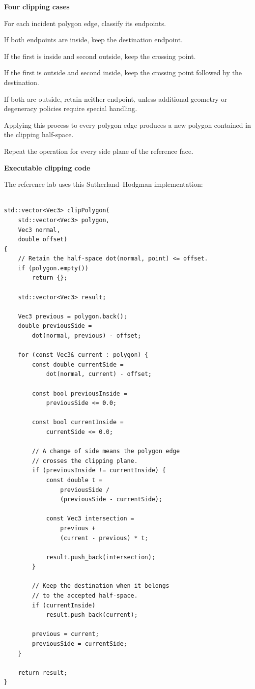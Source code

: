 \textbf{Four clipping cases}

For each incident polygon edge, classify its endpoints.

If both endpoints are inside, keep the destination endpoint.

If the first is inside and second outside, keep the crossing point.

If the first is outside and second inside, keep the crossing point followed by the destination.

If both are outside, retain neither endpoint, unless additional geometry or degeneracy policies require special handling.

Applying this process to every polygon edge produces a new polygon contained in the clipping half-space.

Repeat the operation for every side plane of the reference face.

\textbf{Executable clipping code}

The reference lab uses this Sutherland--Hodgman implementation:

\begin{verbatim}

std::vector<Vec3> clipPolygon(
    std::vector<Vec3> polygon,
    Vec3 normal,
    double offset)
{
    // Retain the half-space dot(normal, point) <= offset.
    if (polygon.empty())
        return {};

    std::vector<Vec3> result;

    Vec3 previous = polygon.back();
    double previousSide =
        dot(normal, previous) - offset;

    for (const Vec3& current : polygon) {
        const double currentSide =
            dot(normal, current) - offset;

        const bool previousInside =
            previousSide <= 0.0;

        const bool currentInside =
            currentSide <= 0.0;

        // A change of side means the polygon edge
        // crosses the clipping plane.
        if (previousInside != currentInside) {
            const double t =
                previousSide /
                (previousSide - currentSide);

            const Vec3 intersection =
                previous +
                (current - previous) * t;

            result.push_back(intersection);
        }

        // Keep the destination when it belongs
        // to the accepted half-space.
        if (currentInside)
            result.push_back(current);

        previous = current;
        previousSide = currentSide;
    }

    return result;
}
\end{verbatim}

